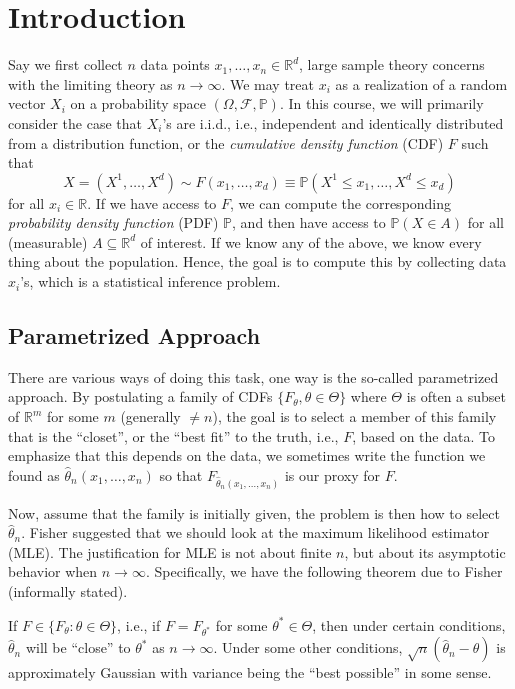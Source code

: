 \chapter{Introduction}
Say we first collect \(n\) data points \(x_1, \dots , x_n \in \mathbb{R} ^d\), large sample theory concerns with the limiting theory as \(n \to \infty \). We may treat \(x_i\) as a realization of a random vector \(X_i\) on a probability space \((\Omega , \mathscr{F} , \mathbb{P} )\). In this course, we will primarily consider the case that \(X_i\)'s are i.i.d., i.e., independent and identically distributed from a distribution function, or the \emph{cumulative density function} (CDF) \(F\) such that
\[
	X = (X^1, \dots , X^d) \sim F(x_1, \dots , x_d) \equiv \mathbb{P} (X^1 \leq x_1, \dots , X^d \leq x_d )
\]
for all \(x_i \in \mathbb{R} \). If we have access to \(F\), we can compute the corresponding \emph{probability density function} (PDF) \(\mathbb{P} \), and then have access to \(\mathbb{P} (X \in A)\) for all (measurable) \(A \subseteq \mathbb{R} ^d\) of interest. If we know any of the above, we know every thing about the population. Hence, the goal is to compute this by collecting data \(x_i\)'s, which is a statistical inference problem.

\section{Parametrized Approach}
There are various ways of doing this task, one way is the so-called parametrized approach. By postulating a family of CDFs \(\{ F_\theta , \theta \in \Theta \} \) where \(\Theta \) is often a subset of \(\mathbb{R} ^m\) for some \(m\) (generally \(\neq n\)), the goal is to select a member of this family that is the ``closet'', or the ``best fit'' to the truth, i.e., \(F\), based on the data. To emphasize that this depends on the data, we sometimes write the function we found as \(\hat{\theta} _n(x_1, \dots  , x_n)\) so that \(F_{\hat{\theta} _n(x_1, \dots , x_n)} \) is our proxy for \(F\).

Now, assume that the family is initially given, the problem is then how to select \(\hat{\theta} _n\). Fisher suggested that we should look at the maximum likelihood estimator (MLE). The justification for MLE is not about finite \(n\), but about its asymptotic behavior when \(n \to \infty \). Specifically, we have the following theorem due to Fisher (informally stated).

\begin{theorem}[Fisher]
	If \(F \in \{ F_\theta \colon \theta \in \Theta \} \), i.e., if \(F = F_{\theta ^{\ast} }\) for some \(\theta ^{\ast} \in \Theta \), then under certain conditions, \(\hat{\theta} _n\) will be ``close'' to \(\theta ^{\ast} \) as \(n \to \infty \). Under some other conditions, \(\sqrt{n}  (\hat{\theta} _n - \theta )\) is approximately Gaussian with variance being the ``best possible'' in some sense.
\end{theorem}


